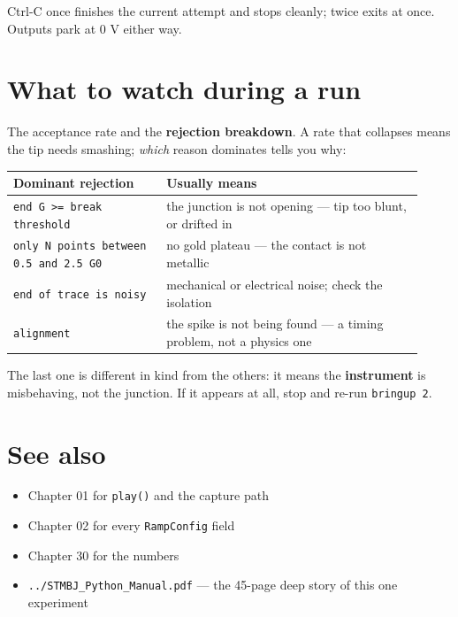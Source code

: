 Ctrl-C once finishes the current attempt and stops cleanly; twice exits at once. Outputs park at 0 V either way.

\section{What to watch during a run}

The acceptance rate and the \textbf{rejection breakdown}. A rate that collapses means the tip needs smashing; \emph{which} reason dominates tells you why:

\small\setlength{\LTleft}{0pt}\setlength{\LTright}{\fill}
\begin{longtable}{@{}>{\raggedright\arraybackslash}p{0.34\linewidth}>{\raggedright\arraybackslash}p{0.58\linewidth}@{}}
\toprule
\textbf{Dominant rejection} & \textbf{Usually means} \\
\midrule\endhead
\texttt{end G >= break threshold} & the junction is not opening --- tip too blunt, or drifted in \\
\texttt{only N points between 0.\discretionary{}{}{}5 and 2.\discretionary{}{}{}5 G0} & no gold plateau --- the contact is not metallic \\
\texttt{end of trace is noisy} & mechanical or electrical noise; check the isolation \\
\texttt{alignment} & the spike is not being found --- a timing problem, not a physics one \\
\bottomrule
\end{longtable}
\normalsize

The last one is different in kind from the others: it means the \textbf{instrument} is misbehaving, not the junction. If it appears at all, stop and re-run \texttt{bringup 2}.

\section{See also}

\begin{itemize}[leftmargin=*]
\item Chapter 01 for \texttt{play()} and the capture path
\item Chapter 02 for every \texttt{Ramp\discretionary{}{}{}Config} field
\item Chapter 30 for the numbers
\item \texttt{.\discretionary{}{}{}.\discretionary{}{}{}/\discretionary{}{}{}STMBJ\_\discretionary{}{}{}Python\_\discretionary{}{}{}Manual.\discretionary{}{}{}pdf} --- the 45-page deep story of this one experiment
\end{itemize}

